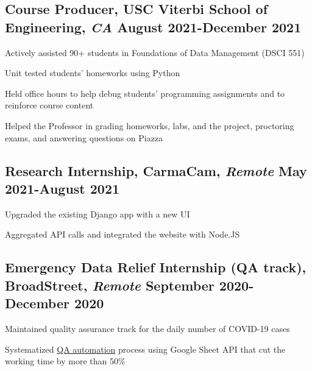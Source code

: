 \documentclass[11pt]{article}
\begin{document}
\subsection*{Course Producer{\normalfont, USC Viterbi School of Engineering,
            \textit{CA} \hfill
            August 2021-December 2021}}
\begin{compactitem}
    \item Actively assisted 90+ students in Foundations of Data Management
    (DSCI 551)
    \item Unit tested students' homeworks using Python
    \item Held office hours to help debug students' programming assignments
    and to reinforce
    course content
    \item Helped the Professor in grading homeworks, labs, and the project,
    proctoring exams, and
    answering questions on Piazza
\end{compactitem}
\vspace{0.1in}

\subsection*{Research Internship{\normalfont, CarmaCam, \textit{Remote} \hfill May 2021-August 2021}}
\begin{compactitem}
    \item Upgraded the existing Django app with a new UI
    \item Aggregated API calls and integrated the website with Node.JS
\end{compactitem}
\vspace{0.1in}

\subsection*{Emergency Data Relief Internship (QA track){\normalfont, BroadStreet, \textit{Remote} \hfill September 2020-December 2020}}
\begin{compactitem}
    \item Maintained quality assurance track for the daily number of COVID-19 cases
    \item Systematized \href{https://github.com/Anthonyive/broadstreet-qa-automation.git}{QA automation}
    process using Google Sheet API that cut the working time by more than
    50\%
\end{compactitem}
\vspace{0.1in}
\end{document}
